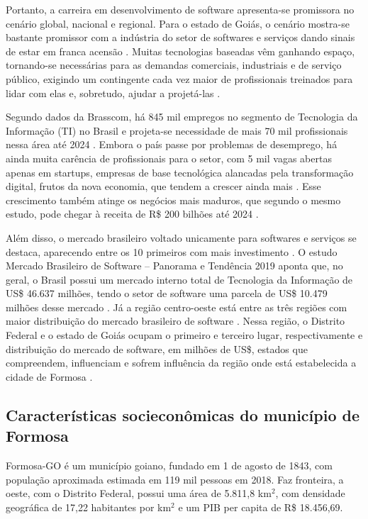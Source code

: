 \documentclass[11pt,fleqn]{book} %
\begin{document}
Portanto, a carreira em desenvolvimento de software apresenta-se promissora no cenário global, nacional e regional. Para o estado de Goiás, o cenário mostra-se bastante promissor com a indústria do setor de softwares e serviços dando sinais de estar em franca acensão \cite{Empreendeder2017}. Muitas tecnologias baseadas vêm ganhando espaço, tornando-se necessárias para as demandas comerciais, industriais e de serviço público, exigindo um contingente cada vez maior de profissionais treinados para lidar com elas e, sobretudo, ajudar a projetá-las \cite{Istoe2019}.

Segundo dados da Brasscom, há 845 mil empregos no segmento de Tecnologia da Informação (TI) no Brasil e projeta-se necessidade de mais 70 mil profissionais nessa área até 2024 \cite{Convergencia2019}. Embora o país passe por problemas de desemprego, há ainda muita carência de profissionais para o setor, com 5 mil vagas abertas apenas em startups, empresas de base tecnológica alancadas pela transformação digital, frutos da nova economia, que tendem a crescer ainda mais \cite{Brasscom2019}. Esse crescimento também atinge os negócios mais maduros, que segundo o mesmo estudo, pode chegar à receita de R\$ 200 bilhões até 2024 \cite{Brasscom2019}.

Além disso, o mercado brasileiro voltado unicamente para softwares e serviços se destaca, aparecendo entre os 10 primeiros com mais investimento \cite{Abes2018}. O estudo Mercado Brasileiro de Software – Panorama e Tendência 2019 aponta que, no geral, o Brasil possui um mercado interno total de Tecnologia da Informação de US\$ 46.637 milhões, tendo o setor de software uma parcela de US\$ 10.479 milhões desse mercado \cite{Abes2018}. Já a região centro-oeste está entre as três regiões com maior distribuição do mercado brasileiro de software \cite{Abes2018}. Nessa região, o Distrito Federal e o estado de Goiás ocupam o primeiro e terceiro lugar, respectivamente e distribuição do mercado de software, em milhões de US\$, estados que compreendem, influenciam e sofrem influência da região onde está estabelecida a cidade de Formosa \cite{Abes2018}.

\subsection{Características socieconômicas do município de Formosa}

Formosa-GO é um município goiano, fundado em 1 de agosto de 1843, com população aproximada estimada em 119 mil pessoas em 2018. Faz fronteira, a oeste, com o Distrito Federal, possui uma área de 5.811,8 km$^2$, com densidade geográfica de 17,22 habitantes por km$^2$ e um PIB per capita de R\$ 18.456,69. 
\end{document}
